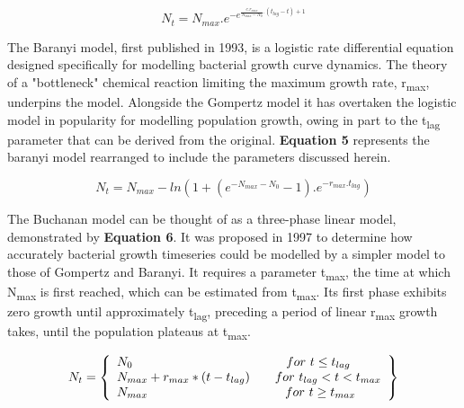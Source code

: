 \documentclass[11pt]{article}
\begin{document}
\begin{equation}
    N_{t} = N_{max} . e^{-e^{\frac{ e . r_{max}   }
                                  { N_{max}-N_{0} } . (t_{lag} - t) + 1}}
\end{equation}
\vspace{3mm}



The Baranyi model, first published in 1993, is a logistic rate differential equation designed specifically for modelling bacterial growth curve dynamics.\parencite{Baranyi1993,Buchanan1997} The theory of a "bottleneck" chemical reaction limiting the maximum growth rate, r\textsubscript{max}, underpins the model.\parencite{Buchanan1997} Alongside the Gompertz model it has overtaken the logistic model in popularity for modelling population growth, owing in part to the t\textsubscript{lag} parameter that can be derived from the original. \textbf{Equation 5} represents the baranyi model rearranged to include the parameters discussed herein.

\begin{equation}
    N_{t} = N_{max} - ln{(1 + (e^{-N_{max} - N_{0}} - 1) . e^{-r_{max} . t_{lag}})}
\end{equation}
\vspace{3mm}



The Buchanan model can be thought of as a three-phase linear model, demonstrated by \textbf{Equation 6}.\parencite{Buchanan1997} It was proposed in 1997 to determine how accurately bacterial growth timeseries could be modelled by a simpler model to those of Gompertz and Baranyi. It requires a parameter t\textsubscript{max}, the time at which N\textsubscript{max} is first reached, which can be estimated from t\textsubscript{max}. Its first phase exhibits zero growth until approximately t\textsubscript{lag}, preceding a period of linear r\textsubscript{max} growth takes, until the population plateaus at t\textsubscript{max}.\parencite{Buchanan1997}

\begin{equation}
    N_{t} = \left\{
    \begin{array}{l}
        N_{0}                   \hspace{43mm}    for \           t \le t_{lag}\\
        N_{max} + r_{max} * (t - t_{lag}) \qquad for \ t_{lag} < t  <  t_{max}\\
        N_{max}                 \hspace{38.5mm}  for \           t \ge t_{max}\\
    \end{array}\right\}
\end{equation}
\vspace{5mm}
\end{document}
